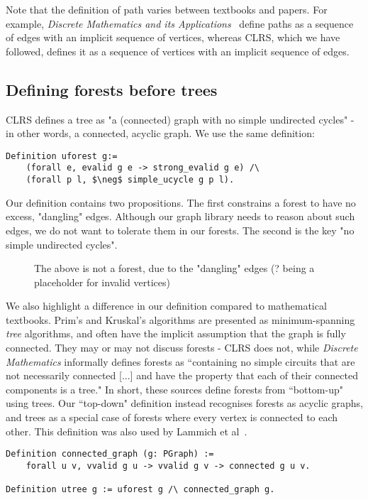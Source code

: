 Note that the definition of path varies between textbooks and papers. For example, \textit{Discrete Mathematics and its Applications}~\cite{rozen} define paths as a sequence of edges with an implicit sequence of vertices, whereas CLRS, which we have followed, defines it as a sequence of vertices with an implicit sequence of edges.

\subsection{Defining forests before trees}

CLRS defines a tree as "a (connected) graph with no simple undirected cycles" - in other words, a connected, acyclic graph. We use the same definition:
\begin{lstlisting}
Definition uforest g:=
	(forall e, evalid g e -> strong_evalid g e) /\
	(forall p l, $\neg$ simple_ucycle g p l).
\end{lstlisting}
Our definition contains two propositions. The first constrains a forest to have no excess, "dangling" edges. Although our graph library needs to reason about such edges, we do not want to tolerate them in our forests. The second is the key "no simple undirected cycles".
\begin{figure}[H]
	\caption{The above is not a forest, due to the "dangling" edges (? being a placeholder for invalid vertices)}
\end{figure}
We also highlight a difference in our definition compared to mathematical textbooks. Prim's and Kruskal's algorithms are presented as minimum-spanning \textit{tree} algorithms, and often have the implicit assumption that the graph is fully connected. They may or may not discuss forests - CLRS does not, while \textit{Discrete Mathematics} informally defines forests as ``containing no simple circuits that are not necessarily connected [...] and have the property that each of their connected components is a tree." In short, these sources define forests from ``bottom-up" using trees. Our ``top-down" definition instead recognises forests as acyclic graphs, and trees as a special case of forests where every vertex is connected to each other. This definition was also used by Lammich et al~\cite{DBLP:journals/afp/LammichN19}.
\begin{lstlisting}
Definition connected_graph (g: PGraph) :=
	forall u v, vvalid g u -> vvalid g v -> connected g u v.

Definition utree g := uforest g /\ connected_graph g.
\end{lstlisting}
